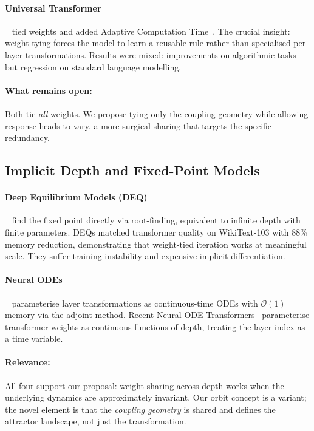 \documentclass[11pt, a4paper]{article}
\newcommand{\bigO}{\mathcal{O}}
\theoremstyle{remark}
\begin{document}
\paragraph{Universal Transformer}~\cite{dehghani2019universal} tied weights and added Adaptive Computation Time~\cite{graves2016adaptive}.
The crucial insight: weight tying forces the model to learn a reusable rule rather than specialised per-layer transformations.
Results were mixed: improvements on algorithmic tasks but regression on standard language modelling.

\paragraph{What remains open:}
Both tie \emph{all} weights.
We propose tying only the coupling geometry while allowing response heads to vary, a more surgical sharing that targets the specific redundancy.

\subsection{Implicit Depth and Fixed-Point Models}

\paragraph{Deep Equilibrium Models (DEQ)}~\cite{bai2019deep} find the fixed point directly via root-finding, equivalent to infinite depth with finite parameters.
DEQs matched transformer quality on WikiText-103 with 88\% memory reduction, demonstrating that weight-tied iteration works at meaningful scale.
They suffer training instability and expensive implicit differentiation.

\paragraph{Neural ODEs}~\cite{chen2018neural} parameterise layer transformations as continuous-time ODEs with $\bigO(1)$ memory via the adjoint method.
Recent Neural ODE Transformers~\cite{neuralode2025transformer} parameterise transformer weights as continuous functions of depth, treating the layer index as a time variable.

\paragraph{Relevance:}
All four support our proposal: weight sharing across depth works when the underlying dynamics are approximately invariant.
Our orbit concept is a variant; the novel element is that the \emph{coupling geometry} is shared and defines the attractor landscape, not just the transformation.
\end{document}
